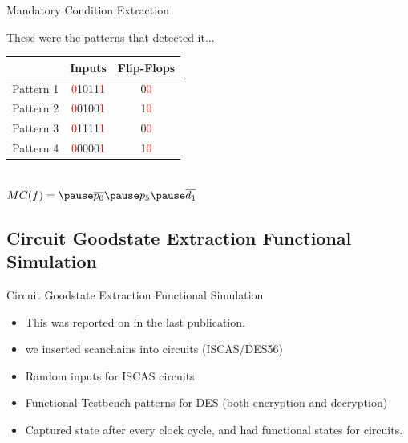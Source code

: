 \documentclass{beamer}
\begin{document}
\begin{frame}{Mandatory Condition Extraction}
    \begin{center}
    \vspace{-3 em}
    These were the patterns that detected it... \pause
    \vspace{2 em}
    \begin{tabular}{| c | c | c |}
        \hline
        & Inputs & Flip-Flops\\
        \hline
        \hline
        Pattern 1 & \textcolor{red}{0}1011\textcolor{red}{1} & 0\textcolor{red}{0} \\
        \hline
        Pattern 2 & \textcolor{red}{0}0100\textcolor{red}{1} & 1\textcolor{red}{0} \\
        \hline
        Pattern 3 & \textcolor{red}{0}1111\textcolor{red}{1} & 0\textcolor{red}{0} \\
        \hline
        Pattern 4 & \textcolor{red}{0}0000\textcolor{red}{1} & 1\textcolor{red}{0} \\
        \hline
    \end{tabular}
        \\\pause $MC(f) = \pause \overline{p_{0}}\pause p_{5}\pause \overline{d_{1}}$
        \end{center}
\end{frame}

\subsection{Circuit Goodstate Extraction Functional Simulation}
\begin{frame}{Circuit Goodstate Extraction Functional Simulation}
\begin{itemize}
    \pause
    \item This was reported on in the last publication.
    \pause
    \item we inserted scanchains into circuits (ISCAS/DES56)
    \pause
    \item Random inputs for ISCAS circuits
    \pause
    \item Functional Testbench patterns for DES (both encryption and decryption)
    \pause
    \item Captured state after every clock cycle, and had functional states for circuits.
\end{itemize}
\end{frame}
\end{document}
